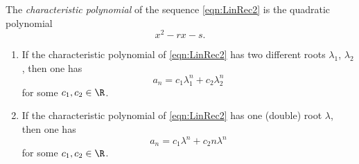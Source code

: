 \begin{page}

\begin{dfn}
The \emph{characteristic polynomial} of the sequence \eqref{eqn:LinRec2} is the quadratic polynomial
\[
x^2 - rx - s.
\]
\end{dfn}

\end{page}

\begin{page}

\begin{thm}
\begin{enumerate}
\item
If the characteristic polynomial of \eqref{eqn:LinRec2} has two different roots $\lambda_1$, $\lambda_2$,
then one has
\[
a_n = c_1 \lambda_1^n + c_2 \lambda_2^n
\]
for some $c_1, c_2 \in \R$.
\item
If the characteristic polynomial of \eqref{eqn:LinRec2} has one (double) root $\lambda$,
then one has
\[
a_n = c_1 \lambda^n + c_2 n \lambda^n
\]
for some $c_1, c_2 \in \R$.
\end{enumerate}
\end{thm}

\end{page}

